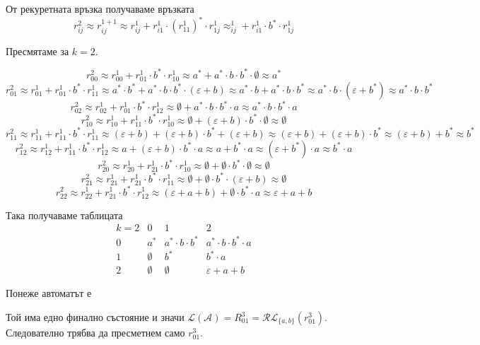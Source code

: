 \documentclass[12pt]{article}
\begin{document}
От рекуретната връзка получаваме връзката \[r_{ij}^{2} \approx r_{ij}^{1 + 1} \approx r_{ij}^1 + r_{i1}^1 \cdot (r_{11}^1)^* \cdot r_{1j}^1 \approx_{ij}^1 + r_{i1}^1 \cdot b^* \cdot r_{1j}^1\]

Пресмятаме за \(k = 2\).

\[r_{00}^{2} \approx r_{00}^1 + r_{01}^1 \cdot b^* \cdot r_{10}^1 \approx
a^* + a^* \cdot b \cdot b^* \cdot \emptyset \approx a^*\]
\[r_{01}^{2} \approx r_{01}^1 + r_{01}^1 \cdot b^* \cdot r_{11}^1 \approx
a^*\cdot b^* + a^* \cdot b \cdot b^* \cdot (\varepsilon + b) \approx a^*\cdot b + a^* \cdot b \cdot b^* \approx a^* \cdot b \cdot (\varepsilon + b^*) \approx a^* \cdot b \cdot b^*\]
\[r_{02}^{2} \approx r_{02}^1 + r_{01}^1 \cdot b^* \cdot r_{12}^1 \approx
\emptyset + a^* \cdot b \cdot b^* \cdot a \approx a^* \cdot b \cdot b^* \cdot a\]
\[r_{10}^{2} \approx r_{10}^1 + r_{11}^1 \cdot b^* \cdot r_{10}^1 \approx
\emptyset + (\varepsilon + b) \cdot b^* \cdot \emptyset \approx \emptyset\]
\[r_{11}^{2} \approx r_{11}^1 + r_{11}^1 \cdot b^* \cdot r_{11}^1 \approx (\varepsilon + b) + (\varepsilon + b) \cdot b^* + (\varepsilon + b) \approx (\varepsilon + b) + (\varepsilon + b) \cdot b^* \approx (\varepsilon + b) + b^* \approx b^*\]
\[r_{12}^{2} \approx r_{12}^1 + r_{11}^1 \cdot b^* \cdot r_{12}^1 \approx
a + (\varepsilon + b) \cdot b^* \cdot a
\approx a + b^* \cdot a \approx (\varepsilon + b^*) \cdot a \approx b^* \cdot a\]
\[r_{20}^{2} \approx r_{20}^1 + r_{21}^1 \cdot b^* \cdot r_{10}^1 \approx
\emptyset + \emptyset \cdot b^* \cdot \emptyset \approx \emptyset\]
\[r_{21}^{2} \approx r_{21}^1 + r_{21}^1 \cdot b^* \cdot r_{11}^1 \approx
\emptyset + \emptyset \cdot b^* \cdot (\varepsilon + b) \approx \emptyset\]
\[r_{22}^{2} \approx r_{22}^1 + r_{21}^1 \cdot b^* \cdot r_{12}^1 \approx
(\varepsilon + a + b) + \emptyset \cdot b^* \cdot a \approx \varepsilon + a + b\]

Така получаваме таблицата
\[\begin{array}{c|ccc}
k = 2 & 0 & 1   & 2     \\ \hline
0   & a^* & a^* \cdot b \cdot b^* & a^* \cdot b \cdot b^* \cdot a \\
1   & \emptyset & b^* & b^* \cdot a \\
2   & \emptyset & \emptyset & \varepsilon + a + b 
\end{array}\]

Понеже автоматът е 
\begin{center}
\end{center}
Той има едно финално състояние и значи \(\mathcal{L}(\mathcal{A}) = R_{01}^3 = \mathcal{RL}_{\{a, b\}}(r_{01}^3)\). Следователно трябва да пресметнем само \(r_{01}^3\).
\end{document}
